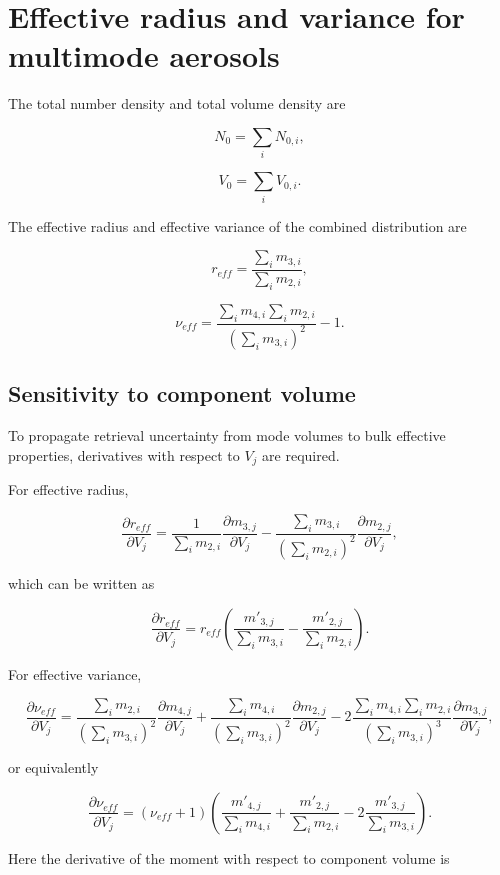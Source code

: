 \documentclass[
  11pt,
  letterpaper,
  DIV=11,
  numbers=noendperiod]{scrreprt}
\begin{document}
\section{Effective radius and variance for multimode
aerosols}\label{effective-radius-and-variance-for-multimode-aerosols}

The total number density and total volume density are

\[
N_0=\sum_i N_{0,i},
\]

\[
V_0=\sum_i V_{0,i}.
\]

The effective radius and effective variance of the combined distribution
are

\[
r_{eff}=\frac{\sum_i m_{3,i}}{\sum_i m_{2,i}},
\]

\[
\nu_{eff}=\frac{\sum_i m_{4,i} \sum_i m_{2,i}}{(\sum_i m_{3,i})^2}-1.
\]

\subsection{Sensitivity to component
volume}\label{sensitivity-to-component-volume}

To propagate retrieval uncertainty from mode volumes to bulk effective
properties, derivatives with respect to \(V_j\) are required.

For effective radius,

\[
\frac{\partial r_{eff}}{\partial V_{j}} =
\frac{1}{\sum_i  m_{2,i}}\frac{\partial m_{3,j}}{\partial V_j}- 
\frac{\sum_i m_{3,i}}{(\sum_i m_{2,i})^2}\frac{\partial m_{2,j}}{\partial V_j},
\]

which can be written as

\[
\frac{\partial r_{eff}}{\partial V_{j}} =
r_{eff} \left(\frac{m'_{3,j}}{\sum_i  m_{3,i}}-\frac{m'_{2,j}}{\sum_i  m_{2,i}}\right).
\]

For effective variance,

\[
\frac{\partial \nu_{eff}}{\partial V_j}=
\frac{\sum_i m_{2,i}}{(\sum_i m_{3,i})^2}\frac{\partial m_{4,j}}{\partial V_j}+
\frac{\sum_i m_{4,i}}{(\sum_i m_{3,i})^2}\frac{\partial m_{2,j}}{\partial V_j}
-2\frac{\sum_i m_{4,i} \sum_i m_{2,i}}{(\sum_i m_{3,i})^3}\frac{\partial m_{3,j}}{\partial V_j},
\]

or equivalently

\[
\frac{\partial \nu_{eff}}{\partial V_j}=
(\nu_{eff}+1) \left(\frac{m'_{4,j}}{\sum_i  m_{4,i}}+\frac{m'_{2,j}}{\sum_i m_{2,i}} 
-2\frac{m'_{3,j}}{\sum_i  m_{3,i}}\right).
\]

Here the derivative of the moment with respect to component volume is
\end{document}
